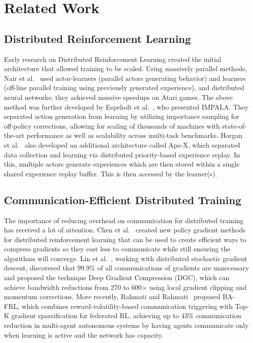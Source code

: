 \chapter{Related Work}

\section{Distributed Reinforcement Learning}

Early research on Distributed Reinforcement Learning created the initial architecture that allowed training to be scaled. Using massively parallel methods, Nair et al.~\cite{nair2015} used actor-learners (parallel actors generating behavior) and learners (off-line parallel training using previously generated experience), and distributed neural networks; they achieved massive speedups on Atari games. The above method was further developed by Espeholt et al.~\cite{impala2018}, who presented IMPALA. They separated action generation from learning by utilizing importance sampling for off-policy corrections, allowing for scaling of thousands of machines with state-of-the-art performance as well as scalability across multi-task benchmarks. Horgan et al.~\cite{apex2018} also developed an additional architecture called Ape-X, which separated data collection and learning via distributed priority-based experience replay. In this, multiple actors generate experiences which are then stored within a single shared experience replay buffer. This is then accessed by the learner(s).

\section{Communication-Efficient Distributed Training}

The importance of reducing overhead on communication for distributed training has received a lot of attention. Chen et al.~\cite{chen2018} created new policy gradient methods for distributed reinforcement learning that can be used to create efficient ways to compress gradients so they cost less to communicate while still ensuring the algorithms will converge. Lin et al.~\cite{dgc2018}, working with distributed stochastic gradient descent, discovered that 99.9\% of all communications of gradients are unnecessary and proposed the technique Deep Gradient Compression (DGC), which can achieve bandwidth reductions from 270 to 600$\times$ using local gradient clipping and momentum corrections. More recently, Rahmati and Rahmati~\cite{bafrl2026} proposed BA-FRL, which combines reward-volatility-based communication triggering with Top-K gradient sparsification for federated RL, achieving up to 43\% communication reduction in multi-agent autonomous systems by having agents communicate only when learning is active and the network has capacity.

